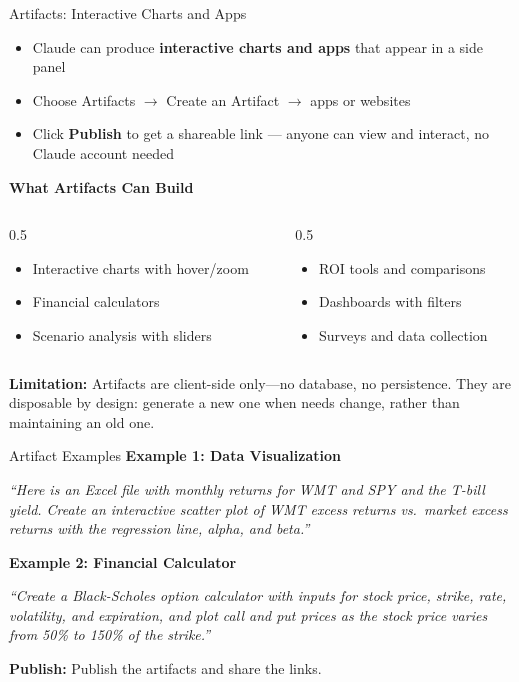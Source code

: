 \documentclass[aspectratio=169]{beamer}
\begin{document}
\begin{frame}{Artifacts: Interactive Charts and Apps}

\begin{itemize}
  \item Claude can produce \textbf{interactive charts and apps} that appear in a side panel
  \item Choose Artifacts $\rightarrow$ Create an Artifact $\rightarrow$ apps or websites
  \item Click \textbf{Publish} to get a shareable link --- anyone can view and interact, no Claude account needed
\end{itemize}

\vspace{0.3cm}

\textbf{What Artifacts Can Build}
\begin{columns}[T]
\begin{column}{0.5\textwidth}
\begin{itemize}\small
  \item Interactive charts with hover/zoom
  \item Financial calculators
  \item Scenario analysis with sliders
\end{itemize}
\end{column}
\begin{column}{0.5\textwidth}
\begin{itemize}\small
  \item ROI tools and comparisons
  \item Dashboards with filters
  \item Surveys and data collection
\end{itemize}
\end{column}
\end{columns}

\vspace{0.2cm}
\small\textbf{Limitation:} Artifacts are client-side only---no database, no persistence.  They are \alert{disposable by design}: generate a new one when needs change, rather than maintaining an old one.
\end{frame}

\begin{frame}{Artifact Examples}
\textbf{Example 1: Data Visualization}

\textit{``Here is an Excel file with monthly returns for WMT and SPY and the T-bill yield. Create an interactive scatter plot of WMT excess returns vs.\ market excess returns with the regression line, alpha, and beta.''}

\vspace{0.3cm}

\textbf{Example 2: Financial Calculator}

\textit{``Create a Black-Scholes option calculator with inputs for stock price, strike, rate, volatility, and expiration, and plot call and put prices as the stock price varies from 50\% to 150\% of the strike.''}

\vspace{0.3cm}
\textbf{Publish:} Publish the artifacts and share the links.
\end{frame}
\end{document}
